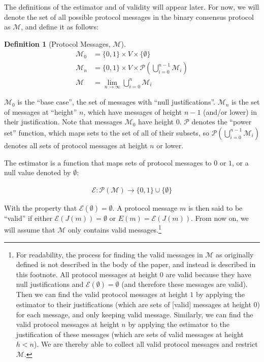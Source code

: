 \documentclass{article}
\theoremstyle{definition}
\newtheorem{defn}{Definition}[section]
\begin{document}
The definitions of the estimator and of validity will appear later. For now, we will denote the set of all possible protocol messages in the binary consensus protocol as $\mathcal{M}$, and define it as follows:

\begin{defn}[Protocol Messages, $\mathcal{M}$]
\begin{equation*}
\begin{split}
    \mathcal{M}_0 &= \{0, 1\} \times V \times \{\emptyset\}\\
    \mathcal{M}_n &= \{0, 1\} \times V \times \mathcal{P}(\bigcup_{i=0}^{n-1} \mathcal{M}_i)\\
    \mathcal{M} &= \lim_{n \to \infty} \bigcup_{i=0}^{n} \mathcal{M}_i
\end{split}
\end{equation*}
\end{defn}

$\mathcal{M}_0$ is the ``base case'', the set of messages with ``null justifications''. $\mathcal{M}_n$ is the set of messages at ``height'' $n$, which have messages of height $n-1$ (and/or lower) in their justification. Note that messages $\mathcal{M}_0$ have height $0$. $\mathcal{P}$ denotes the ``power set'' function, which maps sets to the set of all of their subsets, so $\mathcal{P}(\bigcup_{i=0}^{n-1} \mathcal{M}_i)$ denotes all sets of protocol messages at height $n$ or lower.
	
The estimator is a function that maps sets of protocol messages to $0$ or $1$, or a null value denoted by $\emptyset$:
	
\begin{equation*}
\begin{split}
    \mathcal{E}:\mathcal{P}(\mathcal{M}) \to \{0, 1\} \cup \{\emptyset\}
\end{split}
\end{equation*}

With the property that $\mathcal{E}(\emptyset) = \emptyset$. A protocol message $m$ is then said to be ``valid'' if either $\mathcal{E}(J(m)) = \emptyset$ or $E(m) = \mathcal{E}(J(m))$. From now on, we will assume that $\mathcal{M}$ only contains valid messages.\footnote{For readability, the process for finding the valid messages in $\mathcal{M}$ as originally defined is not described in the body of the paper, and instead is described in this footnote. All protocol messages at height $0$ are valid because they have null justifications and $\mathcal{E}(\emptyset) = \emptyset$ (and therefore these messages are valid). Then we can find the valid protocol messages at height $1$ by applying the estimator to their justifications (which are sets of [valid] messages at height 0) for each message, and only keeping valid message. Similarly, we can find the valid protocol messages at height $n$ by applying the estimator to the justification of these messages (which are sets of valid messages at height $h < n$). We are thereby able to collect all valid protocol messages and restrict $\mathcal{M}.$}
\end{document}
